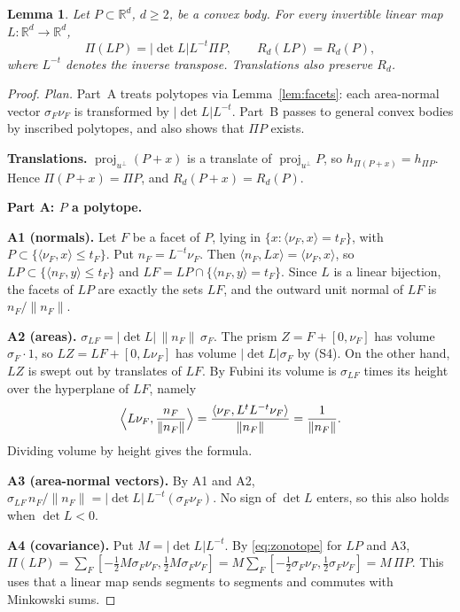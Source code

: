 \documentclass[11pt]{article}
\newtheorem{lemma}[theorem]{Lemma}
\newcommand{\R}{\mathbb R}
\DeclareMathOperator{\proj}{proj}
\newcommand{\step}[1]{\smallskip\noindent\textbf{#1}}
\begin{document}
\begin{lemma}\label{lem:affine}
Let \(P\subset\R^d\), \(d\ge2\), be a convex body. For every
invertible linear map \(L\colon\R^d\to\R^d\),
\[
 \Pi(LP)=|\det L|L^{-t}\Pi P,\qquad R_d(LP)=R_d(P),
\]
where \(L^{-t}\) denotes the inverse transpose. Translations also
preserve \(R_d\).
\end{lemma}

\begin{proof}
\emph{Plan.} Part~A treats polytopes via Lemma~\ref{lem:facets}: each
area-normal vector \(\sigma_F\nu_F\) is transformed by \(|\det L|L^{-t}\).
Part~B passes to general convex bodies by inscribed polytopes, and also
shows that \(\Pi P\) exists.

\step{Translations.} \(\proj_{u^\perp}(P+x)\) is a translate of
\(\proj_{u^\perp}P\), so \(h_{\Pi(P+x)}=h_{\Pi P}\). Hence
\(\Pi(P+x)=\Pi P\), and \(R_d(P+x)=R_d(P)\).

\medskip\noindent\textbf{Part A: \(P\) a polytope.}

\step{A1 (normals).} Let \(F\) be a facet of \(P\), lying in
\(\{x:\langle\nu_F,x\rangle=t_F\}\), with
\(P\subset\{\langle\nu_F,x\rangle\le t_F\}\). Put \(n_F=L^{-t}\nu_F\).
Then \(\langle n_F,Lx\rangle=\langle\nu_F,x\rangle\), so
\(LP\subset\{\langle n_F,y\rangle\le t_F\}\) and
\(LF=LP\cap\{\langle n_F,y\rangle=t_F\}\). Since \(L\) is a linear
bijection, the facets of \(LP\) are exactly the sets \(LF\), and the
outward unit normal of \(LF\) is \(n_F/\|n_F\|\).

\step{A2 (areas).} \(\sigma_{LF}=|\det L|\,\|n_F\|\,\sigma_F\).
The prism \(Z=F+[0,\nu_F]\) has volume \(\sigma_F\cdot1\), so
\(LZ=LF+[0,L\nu_F]\) has volume \(|\det L|\sigma_F\) by (S4). On the other
hand, \(LZ\) is swept out by translates of \(LF\). By Fubini its volume is
\(\sigma_{LF}\) times its height over the hyperplane of \(LF\), namely
\[
 \Bigl\langle L\nu_F,\frac{n_F}{\|n_F\|}\Bigr\rangle
 =\frac{\langle\nu_F,L^tL^{-t}\nu_F\rangle}{\|n_F\|}
 =\frac1{\|n_F\|}.
\]
Dividing volume by height gives the formula.

\step{A3 (area-normal vectors).} By A1 and A2,
\(\sigma_{LF}\,n_F/\|n_F\|=|\det L|\,L^{-t}(\sigma_F\nu_F)\).
No sign of \(\det L\) enters, so this also holds when \(\det L<0\).

\step{A4 (covariance).} Put \(M=|\det L|L^{-t}\). By \eqref{eq:zonotope}
for \(LP\) and A3,
\(\Pi(LP)=\sum_F[-\tfrac12M\sigma_F\nu_F,\tfrac12M\sigma_F\nu_F]
=M\sum_F[-\tfrac12\sigma_F\nu_F,\tfrac12\sigma_F\nu_F]=M\,\Pi P\).
This uses that a linear map sends segments to segments and commutes with
Minkowski sums.


\end{proof}
\end{document}
